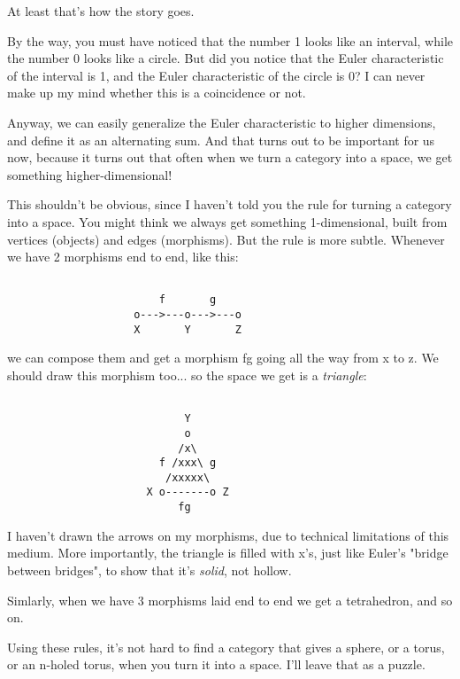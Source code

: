 At least that's how the story goes.  

By the way, you must have noticed that the number 1 looks like an
interval, while the number 0 looks like a circle.  But did you notice
that the Euler characteristic of the interval is 1, and the Euler 
characteristic of the circle is 0?  I can never make up my mind whether
this is a coincidence or not.  

Anyway, we can easily generalize the Euler characteristic to higher
dimensions, and define it as an alternating sum.  And that turns out
to be important for us now, because it turns out that often when we
turn a category into a space, we get something higher-dimensional!

This shouldn't be obvious, since I haven't told you the rule for turning 
a category into a space.  You might think we always get something 
1-dimensional, built from vertices (objects) and edges (morphisms).  
But the rule is more subtle.  Whenever we have 2 morphisms end to end, 
like this:


\begin{verbatim}

                        f       g
                    o--->---o--->---o
                    X       Y       Z
\end{verbatim}
    

we can compose them and get a morphism fg going all the way from x to
z.  We should draw this morphism too... so the space we get is a
\emph{triangle}:


\begin{verbatim}

                            Y
                            o
                           /x\
                        f /xxx\ g
                         /xxxxx\
                      X o-------o Z
                           fg
\end{verbatim}
    
I haven't drawn the arrows on my morphisms, due to technical limitations 
of this medium.  More importantly, the triangle is filled with x's, just 
like Euler's "bridge between bridges", to show that it's 
\emph{solid}, not hollow.

Simlarly, when we have 3 morphisms laid end to end we get a tetrahedron,
and so on.

Using these rules, it's not hard to find a category that gives a sphere, 
or a torus, or an n-holed torus, when you turn it into a space.  I'll 
leave that as a puzzle.  


